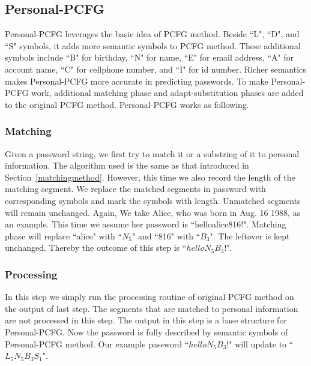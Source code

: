 \subsection{Personal-PCFG}
Personal-PCFG leverages the basic idea of PCFG method. Beside ``L", ``D", and ``S" symbols, it adds more semantic symbols to PCFG method. These additional symbols include ``B" for birthday, ``N" for name, ``E" for email address, ``A" for account name, ``C" for cellphone number, and ``I" for id number. Richer semantics makes Personal-PCFG more accurate in predicting passwords. To make Personal-PCFG work, additional matching phase and adapt-substitution phases are added to the original PCFG method. Personal-PCFG works as following.
\subsubsection{Matching}
Given a password string, we first try to match it or a substring of it to personal information. The algorithm used is the same as that introduced in Section~\ref{matchingmethod}. However, this time we also record the length of the matching segment. We replace the matched segments in password with corresponding symbols and mark the symbols with length. Unmatched segments will remain unchanged. Again, We take Alice, who was born in Aug. 16 1988, as an example. This time we assume her password is ``helloalice816!". Matching phase will replace ``alice" with ``$N_5$" and ``816" with ``$B_3$". The leftover is kept unchanged. Thereby the outcome of this step is ``$helloN_5B_3!$". 
\subsubsection{Processing}
In this step we simply run the processing routine of original PCFG method on the output of last step. The segments that are matched to personal information are not processed in this step. The output in this step is a base structure for Personal-PCFG. Now the password is fully described by semantic symbols of Personal-PCFG method. Our example password ``$helloN_5B_3!$" will update to ``$L_5N_5B_3S_1$". 
